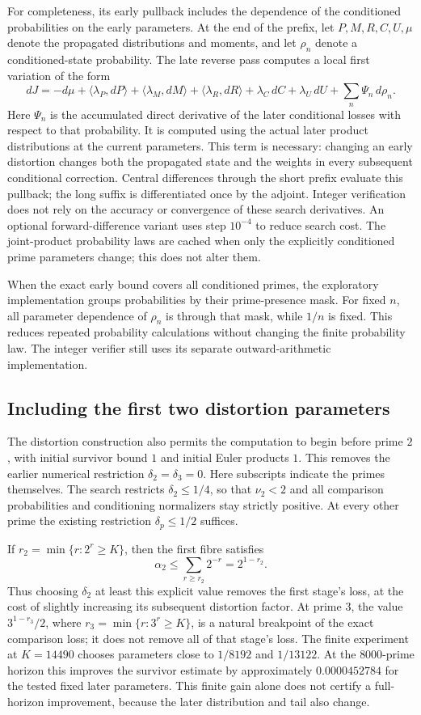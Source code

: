 \documentclass[11pt]{article}
\begin{document}
For completeness, its early pullback includes the dependence of the
conditioned probabilities on the early parameters. At the end of the
prefix, let $P,M,R,C,U,\mu$ denote the propagated distributions and moments,
and let $\rho_n$ denote a conditioned-state probability. The late reverse
pass computes a local first variation of the form
\[
 dJ=-d\mu+\langle\lambda_P,dP\rangle+
 \langle\lambda_M,dM\rangle+\langle\lambda_R,dR\rangle+
 \lambda_C\,dC+\lambda_U\,dU+\sum_n\Psi_n\,d\rho_n.
\]
Here $\Psi_n$ is the accumulated direct derivative of the later conditional
losses with respect to that probability. It is computed using the actual
later product distributions at the current parameters. This term is
necessary: changing an early distortion changes both the propagated state
and the weights in every subsequent conditional correction.
Central differences through the short prefix evaluate this pullback; the
long suffix is differentiated once by the adjoint. Integer verification
does not rely on the accuracy or convergence of these search derivatives.
An optional forward-difference variant uses step $10^{-4}$ to reduce
search cost. The joint-product probability laws are cached when only the
explicitly conditioned prime parameters change; this does not alter them.

When the exact early bound covers all conditioned primes, the exploratory
implementation groups probabilities by their prime-presence mask. For
fixed $n$, all parameter dependence of $\rho_n$ is through that mask,
while $1/n$ is fixed. This reduces repeated probability calculations
without changing the finite probability law. The integer verifier still
uses its separate outward-arithmetic implementation.

\subsection{Including the first two distortion parameters}
The distortion construction also permits the computation to begin before
prime $2$, with initial survivor bound $1$ and initial Euler products $1$.
This removes the earlier numerical restriction $\delta_2=\delta_3=0$.
Here subscripts indicate the primes themselves. The search restricts
$\delta_2\leq1/4$, so that $\nu_2<2$ and all comparison probabilities and
conditioning normalizers stay strictly positive. At every other prime the
existing restriction $\delta_p\leq1/2$ suffices.

If $r_2=\min\{r:2^r\geq K\}$, then the first fibre satisfies
\[
 \alpha_2\leq\sum_{r\geq r_2}2^{-r}=2^{1-r_2}.
\]
Thus choosing $\delta_2$ at least this explicit value removes the first
stage's loss, at the cost of slightly increasing its subsequent distortion
factor. At prime $3$, the value
$3^{1-r_3}/2$, where $r_3=\min\{r:3^r\geq K\}$, is a natural breakpoint
of the exact comparison loss; it does not remove all of that stage's loss.
The finite experiment at $K=14490$ chooses parameters close to
$1/8192$ and $1/13122$. At the $8000$-prime horizon this improves the
survivor estimate by approximately $0.0000452784$ for the tested fixed
later parameters. This finite gain alone does not certify a full-horizon
improvement, because the later distribution and tail also change.
\end{document}
